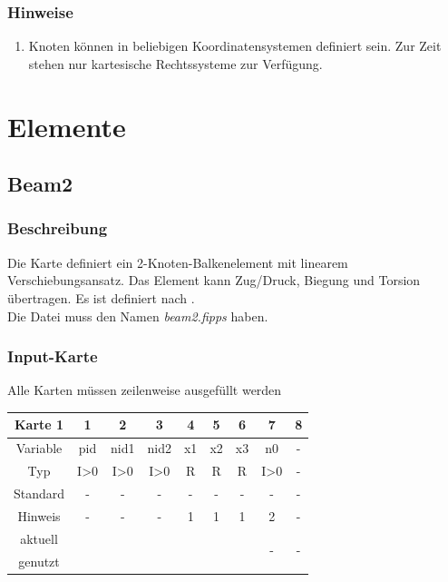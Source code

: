 \documentclass[11pt,titlepage,listof=totoc,bibliography=totoc,twoside]{scrreprt}
\begin{document}
{{\subsubsection{Hinweise}

\begin{enumerate}
\item Knoten können in beliebigen Koordinatensystemen definiert sein. Zur Zeit stehen nur kartesische Rechtssysteme zur Verfügung.
\end{enumerate}

\newpage

\section{Elemente}

\subsection{Beam2}

\subsubsection{Beschreibung}

Die Karte definiert ein 2-Knoten-Balkenelement mit linearem Verschiebungsansatz. Das Element kann Zug/Druck, Biegung und Torsion übertragen. Es ist definiert nach \cite{Prze1968}.\\
Die Datei muss den Namen \emph{beam2.fipps} haben.

\subsubsection{Input-Karte}

Alle Karten müssen zeilenweise ausgefüllt werden

\begin{table}[htbp]
\centering
\begin{tabularx}{\textwidth}{cCCCCCCCC}
\toprule
Karte 1	& 1		& 2		& 3		& 4		& 5		& 6		& 7	& 8	\\
\midrule
Variable& pid		& nid1		& nid2		& x1  		& x2 		& x3 	 	& n0	& -	\\
Typ	& I>0		& I>0		& I>0		& R  		& R		& R  		& I>0	& -	\\
Standard& -		& -		& -		& -		& -		& -		& -	& -	\\
Hinweis	& -		& -		& -		& 1		& 1		& 1		& 2	& -	\\
aktuell	& 	& 	& 	& 	& 	& 	& \multirow{2}{*}{-}	& 	\\
genutzt \\
\bottomrule
\end{tabularx}
\end{table}

}}
\end{document}
